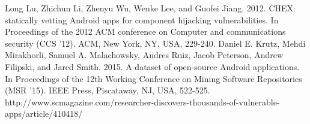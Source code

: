 \documentclass[11pt]{article} %
\begin{document}
\begin{thebibliography}{9}
Long Lu, Zhichun Li, Zhenyu Wu, Wenke Lee, and Guofei Jiang. 2012. CHEX: statically vetting Android apps for component hijacking vulnerabilities. In Proceedings of the 2012 ACM conference on Computer and communications security (CCS '12). ACM, New York, NY, USA, 229-240.
Daniel E. Krutz, Mehdi Mirakhorli, Samuel A. Malachowsky, Andres Ruiz, Jacob Peterson, Andrew Filipski, and Jared Smith. 2015. A dataset of open-source Android applications. In Proceedings of the 12th Working Conference on Mining Software Repositories (MSR '15). IEEE Press, Piscataway, NJ, USA, 522-525.
http://www.scmagazine.com/researcher-discovers-thousands-of-vulnerable-apps/article/410418/

\end{thebibliography}
\end{document}

